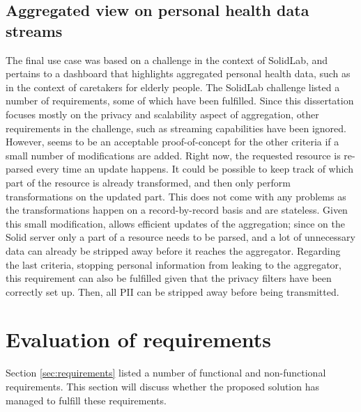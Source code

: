 \subsection{Aggregated view on personal health data streams}
The final use case was based on a challenge in the context of SolidLab, and pertains
to a dashboard that highlights aggregated personal health data, such as in the context of caretakers for elderly people. The SolidLab challenge listed a number of requirements, some of which have been fulfilled. Since this dissertation focuses mostly on the privacy and scalability aspect of aggregation, other requirements in the challenge, such as streaming capabilities have been ignored.
However, \middleware{} seems to be an acceptable proof-of-concept for the other criteria if a small number of modifications are added. Right now, the requested resource is re-parsed every time an update happens. It could be possible to keep track of which part of the resource is already transformed, and then only perform transformations on the updated part. This does not come with any problems as the transformations happen on a record-by-record basis and are stateless. Given this small modification, \middleware{} allows efficient updates of the aggregation; since on the Solid server only a part of a resource needs to be parsed, and a lot of unnecessary data can already be stripped away before it reaches the aggregator. 
Regarding the last criteria, stopping personal information from leaking to the aggregator, this requirement can also be fulfilled given that the privacy filters have been correctly set up. Then, all \gls{PII} can be stripped away before being transmitted.

\section{Evaluation of requirements}
Section \ref{sec:requirements} listed a number of functional and non-functional requirements. This section will discuss whether the proposed solution has managed to fulfill these requirements.

